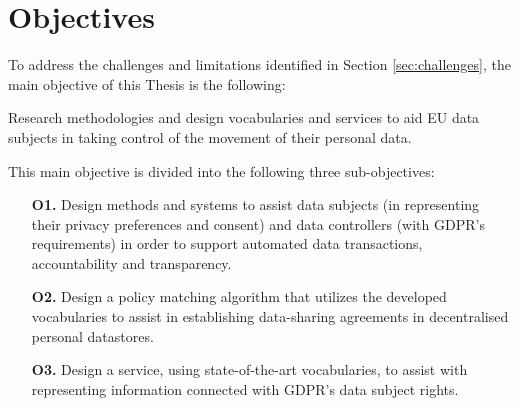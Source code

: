 \section{Objectives}
\label{sec:objectives}

To address the challenges and limitations identified in Section \ref{sec:challenges}, the main objective of this Thesis is the following:

\begin{tcolorbox}[colback=royallavender!20]
Research methodologies and design vocabularies and services to aid EU data subjects in taking control of the movement of their personal data.
\end{tcolorbox}

This main objective is divided into the following three sub-objectives:

\begin{enumerate}
    \item [\textbf{O1.}] Design methods and systems to assist data subjects (in representing their privacy preferences and consent) and data controllers (with GDPR’s requirements) in order to support automated data transactions, accountability and transparency.
    \item [\textbf{O2.}] Design a policy matching algorithm that utilizes the developed vocabularies to assist in establishing data-sharing agreements in decentralised personal datastores.
    \item [\textbf{O3.}] Design a service, using state-of-the-art vocabularies, to assist with representing information connected with GDPR’s data subject rights.
\end{enumerate}
